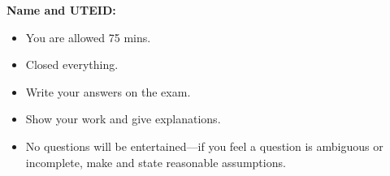 \documentclass[11pt]{exam}
\title{}
\author{}
\date{}
\begin{document}
\maketitle

\large

{\bf Name and UTEID:}
\vfill

\begin{itemize}
\item You are allowed 75 mins.
\item Closed everything.
\item Write your answers on the exam. 
\item Show your work and give explanations. 
\item No questions will be entertained---if you feel
a question is ambiguous or incomplete, make and state
reasonable assumptions. 
\end{itemize}

\vfill
\begin{center}
\pointtable[h][questions]
\end{center}

\vfill

\newpage
\end{document}
